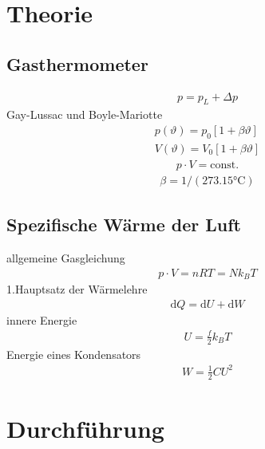 \documentclass[12pt,a4paper,titlepage,headinclude,bibtotoc]{scrartcl}
\newcommand{\dif}{\ensuremath{\mathrm{d}}}
\begin{document}
\section{Theorie}
\label{sec:theorie}
\subsection{Gasthermometer}
\begin{align}
	p=p_L+\Delta p
\end{align}
Gay-Lussac und Boyle-Mariotte
\begin{align}
	p(\vartheta)=p_0 [1+\beta\vartheta]\\
	V(\vartheta)=V_0 [1+\beta\vartheta]
\end{align}
\begin{align}
	p\cdot V=\text{const}.
\end{align}
\begin{align}
	\beta=1/(273.15 \si{\celsius})
\end{align}

\subsection{Spezifische Wärme der Luft}
allgemeine Gasgleichung
\begin{align}
	p \cdot V = nRT = Nk_B T 
\end{align}
1.Hauptsatz der Wärmelehre
\begin{align}
	\dif Q = \dif U+\dif W
\end{align}
innere Energie
\begin{align}
	U=\frac{f}{2} k_B T
\end{align}
Energie eines Kondensators
\begin{align}
	W=\frac{1}{2}CU^2
\end{align}

\section{Durchführung}
\label{sec:durchfuehrung}
\end{document}
